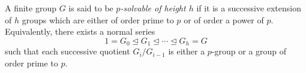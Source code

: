 A finite group $G$ is said to be \emph{$p$-solvable of height $h$} if it is a successive extension of $h$ groups which are either of order prime to $p$ or of order a power of $p$. Equivalently, there exists a normal series
$$
1 = G_0 \trianglelefteq G_1 \trianglelefteq \cdots \trianglelefteq G_h = G
$$
such that each successive quotient $G_i / G_{i-1}$ is either a $p$-group or a group of order prime to $p$.
